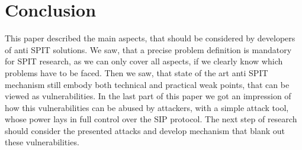 \documentclass[final
	]{issa}
\begin{document}
\section{Conclusion}
This paper described the main aspects, that should be considered by developers of anti SPIT solutions. We saw, that a precise problem definition is mandatory for SPIT research, as we can only cover all aspects, if we clearly know which problems have to be faced. Then we saw, that state of the art anti SPIT mechanism still embody both technical and practical weak points, that can be viewed as vulnerabilities. In the last part of this paper we got an impression of how this vulnerabilities can be abused by attackers, with a simple attack tool, whose power lays in full control over the SIP protocol. The next step of research should consider the presented attacks and develop mechanism that blank out these vulnerabilities.
\end{document}

